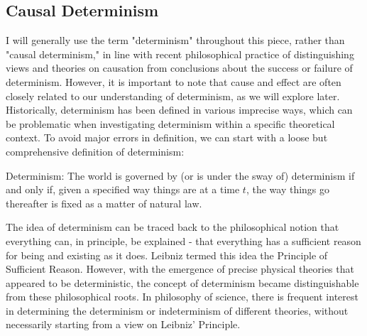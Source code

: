 \documentclass[10pt,a4paper]{article}
\newcounter{theo}
\begin{document}
        \subsection{Causal Determinism}
            I will generally use the term "determinism" throughout this piece, rather than "causal determinism," in line with recent philosophical practice of distinguishing views and theories on causation from conclusions about the success or failure of determinism. However, it is important to note that cause and effect are often closely related to our understanding of determinism, as we will explore later. Historically, determinism has been defined in various imprecise ways, which can be problematic when investigating determinism within a specific theoretical context. To avoid major errors in definition, we can start with a loose but comprehensive definition of determinism:
            \begin{qt}
                Determinism: The world is governed by (or is under the sway of) determinism if and only if, given a specified way things are at a time $t$, the way things go thereafter is fixed as a matter of natural law.
            \end{qt}
            The idea of determinism can be traced back to the philosophical notion that everything can, in principle, be explained - that everything has a sufficient reason for being and existing as it does. Leibniz termed this idea the Principle of Sufficient Reason. However, with the emergence of precise physical theories that appeared to be deterministic, the concept of determinism became distinguishable from these philosophical roots. In philosophy of science, there is frequent interest in determining the determinism or indeterminism of different theories, without necessarily starting from a view on Leibniz’ Principle.\cite{sep-determinism-causal}
\end{document}
